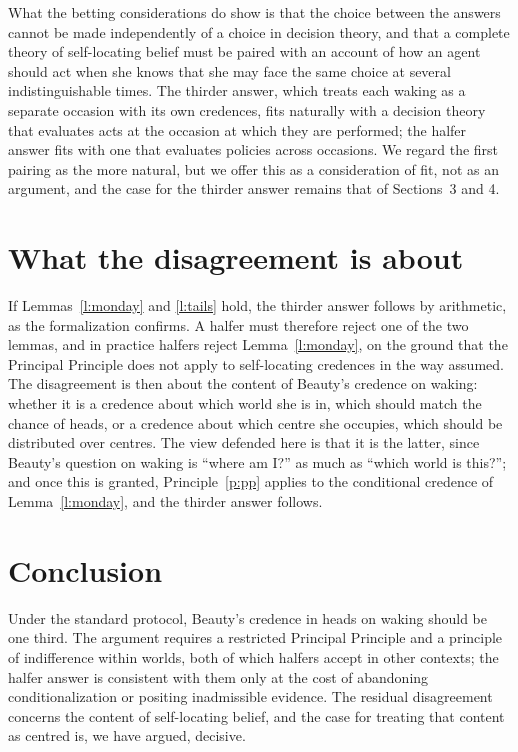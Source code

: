 \documentclass{situationist-preprint}
\begin{document}
What the betting considerations do show is that the choice between the answers cannot be made independently of a choice in decision theory, and that a complete theory of self-locating belief must be paired with an account of how an agent should act when she knows that she may face the same choice at several indistinguishable times. The thirder answer, which treats each waking as a separate occasion with its own credences, fits naturally with a decision theory that evaluates acts at the occasion at which they are performed; the halfer answer fits with one that evaluates policies across occasions. We regard the first pairing as the more natural, but we offer this as a consideration of fit, not as an argument, and the case for the thirder answer remains that of Sections~3 and 4.

\section{What the disagreement is about}

If Lemmas~\ref{l:monday} and \ref{l:tails} hold, the thirder answer follows by arithmetic, as the formalization confirms. A halfer must therefore reject one of the two lemmas, and in practice halfers reject Lemma~\ref{l:monday}, on the ground that the Principal Principle does not apply to self-locating credences in the way assumed. The disagreement is then about the content of Beauty's credence on waking: whether it is a credence about which world she is in, which should match the chance of heads, or a credence about which centre she occupies, which should be distributed over centres. The view defended here is that it is the latter, since Beauty's question on waking is \enquote{where am I?} as much as \enquote{which world is this?}; and once this is granted, Principle~\ref{p:pp} applies to the conditional credence of Lemma~\ref{l:monday}, and the thirder answer follows.

\section{Conclusion}

Under the standard protocol, Beauty's credence in heads on waking should be one third. The argument requires a restricted Principal Principle and a principle of indifference within worlds, both of which halfers accept in other contexts; the halfer answer is consistent with them only at the cost of abandoning conditionalization or positing inadmissible evidence. The residual disagreement concerns the content of self-locating belief, and the case for treating that content as centred is, we have argued, decisive.
\end{document}
